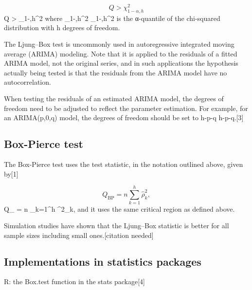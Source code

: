 \[{\displaystyle Q>\chi _{1-\alpha ,h}^{2}} \]
Q > \chi_{1-\alpha,h}^2
where {\displaystyle \chi _{1-\alpha ,h}^{2}} \chi_{1-\alpha,h}^2 is the α-quantile of the chi-squared distribution with h degrees of freedom.

The Ljung–Box test is uncommonly used in autoregressive integrated moving average (ARIMA) modeling. Note that it is applied to the residuals of a fitted ARIMA model, not the original series, and in such applications the hypothesis actually being tested is that the residuals from the ARIMA model have no autocorrelation. 


When testing the residuals of an estimated ARIMA model, the degrees of freedom need to be adjusted to reflect the parameter estimation. For example, for an ARIMA(p,0,q) model, the degrees of freedom should be set to {\displaystyle h-p-q} h-p-q.[3]

\subsection*{Box-Pierce test}
The Box-Pierce test uses the test statistic, in the notation outlined above, given by[1]

\[{\displaystyle Q_{\text{BP}}=n\sum _{k=1}^{h}{\hat {\rho }}_{k}^{2},} \] 
Q_ = n \sum_{k=1}^h \hat{\rho}^2_k,
and it uses the same critical region as defined above.

Simulation studies have shown that the Ljung–Box statistic is better for all sample sizes including small ones.[citation needed]

\subsection*{Implementations in statistics packages}
R: the Box.test function in the stats package[4]
